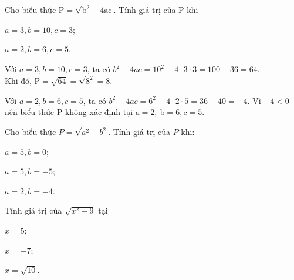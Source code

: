 \begin{bt}
	Cho biểu thức $\mathrm{P}=\sqrt{\mathrm{b}^{2}-4 \mathrm{ac}}$. Tính giá trị của $\mathrm{P}$ khi
	\begin{listEX}[2]
	\item $a=3, b=10, c=3$;
	\item $a=2, b=6, c=5$.
	\end{listEX}
	\loigiai
	{\begin{listEX}[1]
	\item Với $a=3, b=10, c=3$, ta có $b^{2}-4 a c=10^{2}-4 \cdot 3 \cdot 3=100-36=64$.\\
	Khi đó, $\mathrm{P}=\sqrt{64}=\sqrt{8^{2}}=8$.
	\item Với $a=2, b=6, c=5$, ta có $b^{2}-4 a c=6^{2}-4 \cdot 2 \cdot 5=36-40=-4$. Vì $-4<0$ nên biểu thức $\mathrm{P}$ không xác định tại $\mathrm{a}=2, \mathrm{~b}=6, \mathrm{c}=5$.
	\end{listEX}}
\end{bt}
\begin{bt}
	Cho biểu thức $P=\sqrt{a^{2}-b^{2}}$. Tính giá trị của $P$ khi:
	\begin{listEX}[3]
	\item $a=5, b=0$;
	\item $a=5, b=-5$;
	\item $a=2, b=-4$.
	\end{listEX}
\end{bt}
\begin{bt}
	Tính giá trị của $\sqrt{x^2-9}$ tại
	\begin{listEX}[3]
	\item $x=5$;
	\item $x=-7$;
	\item $x=\sqrt{10}$.
	\end{listEX}
\end{bt}
